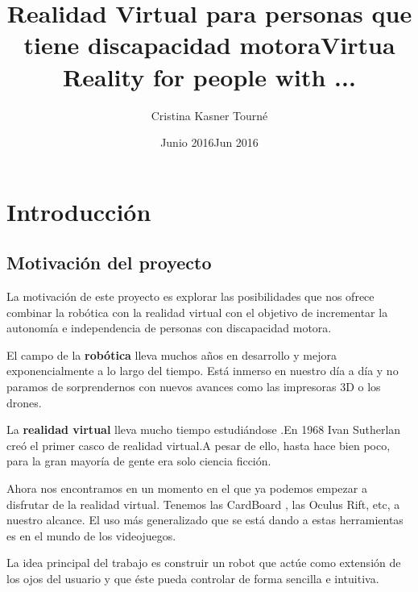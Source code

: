 \documentclass[twoside, 12pt]{epstfg}
\title[spa]{Realidad Virtual para personas que tiene discapacidad motora}
\title[eng]{Virtua Reality for people with ...}
\author{Cristina Kasner Tourné}
\date[spa]{Junio 2016}
\date[eng]{Jun 2016}
\begin{document}

\frontmatter

\maketitle[spa]

\makeinnertitle[spa]

\makeabstract[spa]
\makeabstract[eng]

\tableofcontents
\clearpage
\listoftables
\clearpage
\listoffigures
\cleardoublepage

\printnoidxglossaries

\mainmatter
\chapter{Introducción} 


\section{Motivación del proyecto}

La motivación de este proyecto es explorar las posibilidades que nos ofrece combinar la robótica con la realidad virtual con el objetivo de incrementar la autonomía e independencia de personas con discapacidad motora.

El campo de la \textbf{robótica} lleva muchos años en desarrollo y mejora exponencialmente a lo largo del tiempo. Está inmerso en nuestro día a día y no paramos de sorprendernos con nuevos avances como las impresoras 3D o los drones.

La \textbf{realidad virtual}  lleva mucho tiempo estudiándose .En 1968 Ivan Sutherlan creó el primer casco de realidad virtual.A pesar de ello, hasta hace bien poco, para la gran mayoría de gente era solo ciencia ficción.

Ahora nos encontramos en un momento en el que ya podemos empezar a disfrutar de la realidad virtual. Tenemos las CardBoard , las Oculus Rift, etc, a nuestro alcance.
El uso más generalizado que se está dando a estas herramientas es en el mundo de los videojuegos.

La idea principal del trabajo es construir un robot que actúe como extensión de los ojos del usuario y que éste pueda controlar de forma sencilla e intuitiva.
\end{document}

